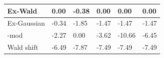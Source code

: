 \begin{tabular}{|l|l|l|l|l|l|}
\hline
Ex-Wald&0.00&-0.38&0.00&0.00&0.00\\\hline
Ex-Gaussian&-0.34&-1.85&-1.47&-1.47&-1.47\\\hline
\rocdd{}-mod&-2.27&0.00&-3.62&-10.66&-6.45\\\hline
Wald shift&-6.49&-7.87&-7.49&-7.49&-7.49\\\hline
\end{tabular}
